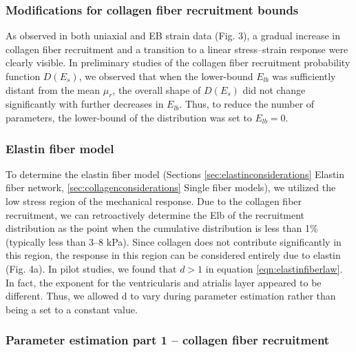     
\subsubsection{Modifications for collagen fiber recruitment bounds}

    As observed in both uniaxial and EB strain data (Fig. 3), a gradual increase in collagen fiber recruitment and a transition to a linear stress–strain response were clearly visible. In preliminary studies of the collagen fiber recruitment probability function $D(E_s)$, we observed that when the lower-bound $E_{lb}$ was sufficiently distant from the mean $\mu_r$, the overall shape of $D(E_s)$ did not change significantly with further decreases in $E_{lb}$. Thus, to reduce the number of parameters, the lower-bound of the distribution was set to $E_{lb} = 0$.
    

\subsubsection{Elastin fiber model} \label{c2:sec:elastinfibermodel}

    To determine the elastin fiber model (Sections \ref{sec:elastinconsiderations} Elastin fiber network, \ref{sec:collagenconsiderations} Single fiber models), we utilized the low stress region of the mechanical response. Due to the collagen fiber recruitment, we can retroactively determine the Elb of the recruitment distribution as the point when the cumulative distribution is less than 1\% (typically less than 3–8 kPa). Since collagen does not contribute significantly in this region, the response in this region can be considered entirely due to elastin (Fig. 4a). In pilot studies, we found that $d>1$ in equation \ref{eqn:elastinfiberlaw}. In fact, the exponent for the ventricularis and atrialis layer appeared to be different. Thus, we allowed d to vary during parameter estimation rather than being a set to a constant value.


\subsubsection{Parameter estimation part 1 – collagen fiber recruitment} \label{c2:sec:2254}

